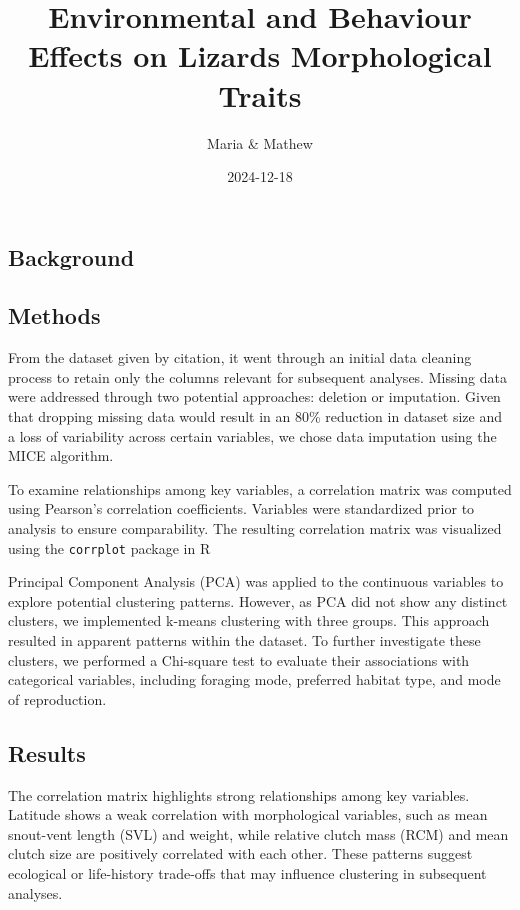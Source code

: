 \documentclass[
]{article}
\title{Environmental and Behaviour Effects on Lizards Morphological
Traits}
\author{Maria \& Mathew}
\date{2024-12-18}
\begin{document}
\maketitle

\subsection{Background}\label{background}

\subsection{Methods}\label{methods}

From the dataset given by citation, it went through an initial data
cleaning process to retain only the columns relevant for subsequent
analyses. Missing data were addressed through two potential approaches:
deletion or imputation. Given that dropping missing data would result in
an 80\% reduction in dataset size and a loss of variability across
certain variables, we chose data imputation using the MICE algorithm.

To examine relationships among key variables, a correlation matrix was
computed using Pearson's correlation coefficients. Variables were
standardized prior to analysis to ensure comparability. The resulting
correlation matrix was visualized using the \texttt{corrplot} package in
R

Principal Component Analysis (PCA) was applied to the continuous
variables to explore potential clustering patterns. However, as PCA did
not show any distinct clusters, we implemented k-means clustering with
three groups. This approach resulted in apparent patterns within the
dataset. To further investigate these clusters, we performed a
Chi-square test to evaluate their associations with categorical
variables, including foraging mode, preferred habitat type, and mode of
reproduction.

\subsection{Results}\label{results}

The correlation matrix highlights strong relationships among key
variables. Latitude shows a weak correlation with morphological
variables, such as mean snout-vent length (SVL) and weight, while
relative clutch mass (RCM) and mean clutch size are positively
correlated with each other. These patterns suggest ecological or
life-history trade-offs that may influence clustering in subsequent
analyses.
\end{document}
